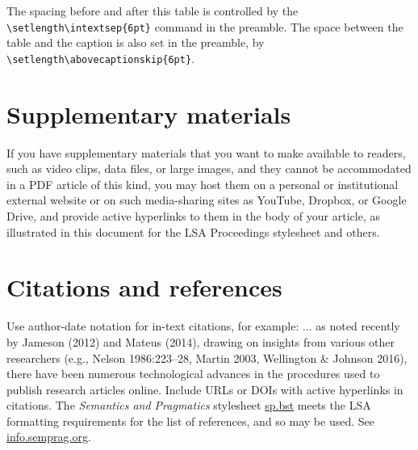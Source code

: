 \documentclass[12pt,letterpaper]{article}
\begin{document}
\noindent The spacing before and after this table is controlled by the \verb=\setlength\intextsep{6pt}= command in the preamble. The space between the table and the caption is also set in the preamble, by \verb=\setlength\abovecaptionskip{6pt}=.


 
 \section{Supplementary materials} If you have supplementary materials that you want to make available to readers, such as video clips, data files, or large images, and they cannot be accommodated in a PDF article of this kind, you may host them on a personal or institutional external website or on such media-sharing sites as YouTube, Dropbox, or Google Drive, and provide active hyperlinks to them in the body of your article, as illustrated in this document for the LSA Proceedings stylesheet and others.
 
 
 
\section{Citations and references} Use author-date notation for in-text citations, for example: ... as noted recently by Jameson (2012) and Mateus (2014), drawing on insights from various other researchers (e.g., Nelson 1986:223–28, Martin 2003, Wellington \& Johnson 2016), there have been numerous technological advances in the procedures used to publish research articles online. Include URLs or DOIs with active hyperlinks in citations. The \textit{Semantics and Pragmatics} stylesheet \href{https://raw.githubusercontent.com/semprag/tex/master/sp.bst}{sp.bst} meets the LSA formatting requirements for the list of references, and so may be used. See \href{http://info.semprag.org}{info.semprag.org}. 
\setlength{\bibsep}{0pt plus 0.3ex}
\setlength{\bibhang}{0.3in}			%
\titleformat{\section}{\normalfont\bfseries}{\thesection}{.5em}{}		%

\newcommand{\doi}[1]{\href{http://dx.doi.org/#1}{http://dx.doi.org/#1}}	%
\end{document}
